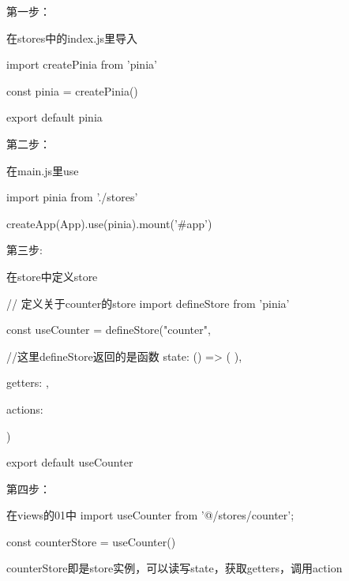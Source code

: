 第一步：

  在stores中的index.js里导入

    import { createPinia } from 'pinia'

    const pinia = createPinia()

    export default pinia



第二步：

  在main.js里use

    import pinia from './stores'

    createApp(App).use(pinia).mount('#app')



第三步:

  在store中定义store

    // 定义关于counter的store
    import { defineStore } from 'pinia'
    
    const useCounter = defineStore("counter", {       //这里defineStore返回的是函数
      state: () => ({ }),

      getters: { },

      actions: { }

    })
    
    export default useCounter
  


第四步：

在views的01中
  import useCounter from '@/stores/counter';

  const counterStore = useCounter()

  counterStore即是store实例，可以读写state，获取getters，调用action